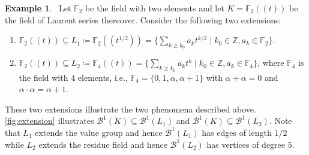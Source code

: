 \documentclass[10pt]{article}
\theoremstyle{definition}
\newtheorem{example}[theorem]{Example}
\newcommand{\FF}{\mathbb{F}}
\newcommand{\ZZ}{\mathbb{Z}}
\begin{document}
\begin{example}
  \label{ex:extension}\
  Let $\FF_2$ be the field with two elements and let $K=\FF_2(\!(t)\!)$ be the field of Laurent series thereover. Consider the following two extensions:
  \begin{enumerate}
  \item[(i)] $\FF_2(\!(t)\!)\subseteq L_1\coloneqq \FF_2(\!(t^{1/2})\!)=\{\sum_{k\geq k_0}a_kt^{k/2}\mid k_0\in\ZZ, a_k\in\FF_2\}$.
  \item[(ii)] $\FF_2(\!(t)\!)\subseteq L_2\coloneqq \FF_4(\!(t)\!)=\{\sum_{k\geq k_0}a_kt^{k}\mid k_0\in\ZZ, a_k\in\FF_4\}$, where $\FF_4$ is the field with $4$ elements, i.e., $\FF_4=\{0,1,\alpha,\alpha+1\}$ with $\alpha+\alpha=0$ and $\alpha\cdot\alpha=\alpha+1$.
  \end{enumerate}

These two extensions illustrate the two phenomena described above. \cref{fig:extension} illustrates $\mathcal B^1(K)\subseteq \mathcal B^1(L_1)$ and $\mathcal B^1(K)\subseteq \mathcal B^1(L_2)$.  Note that $L_1$ extends the value group and hence $\mathcal B^1(L_1)$ has edges of length $1/2$ while $L_2$ extends the residue field and hence $\mathcal B^1(L_2)$ has vertices of degree $5$.
\end{example}
\end{document}
